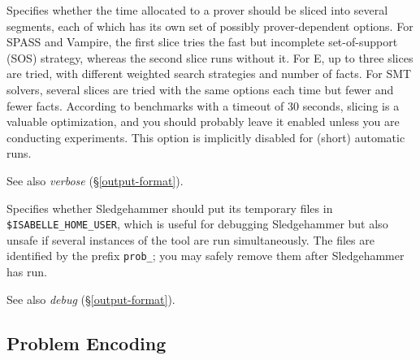 \documentclass[a4paper,12pt]{article}
\begin{document}
\begin{enum}
Specifies whether the time allocated to a prover should be sliced into several
segments, each of which has its own set of possibly prover-dependent options.
For SPASS and Vampire, the first slice tries the fast but incomplete
set-of-support (SOS) strategy, whereas the second slice runs without it. For E,
up to three slices are tried, with different weighted search strategies and
number of facts. For SMT solvers, several slices are tried with the same options
each time but fewer and fewer facts. According to benchmarks with a timeout of
30 seconds, slicing is a valuable optimization, and you should probably leave it
enabled unless you are conducting experiments. This option is implicitly
disabled for (short) automatic runs.

\nopagebreak
{\small See also \textit{verbose} (\S\ref{output-format}).}

Specifies whether Sledgehammer should put its temporary files in
\texttt{\$ISA\-BELLE\_\allowbreak HOME\_\allowbreak USER}, which is useful for
debugging Sledgehammer but also unsafe if several instances of the tool are run
simultaneously. The files are identified by the prefix \texttt{prob\_}; you may
safely remove them after Sledgehammer has run.

\nopagebreak
{\small See also \textit{debug} (\S\ref{output-format}).}
\end{enum}

\subsection{Problem Encoding}
\label{problem-encoding}
\end{document}
